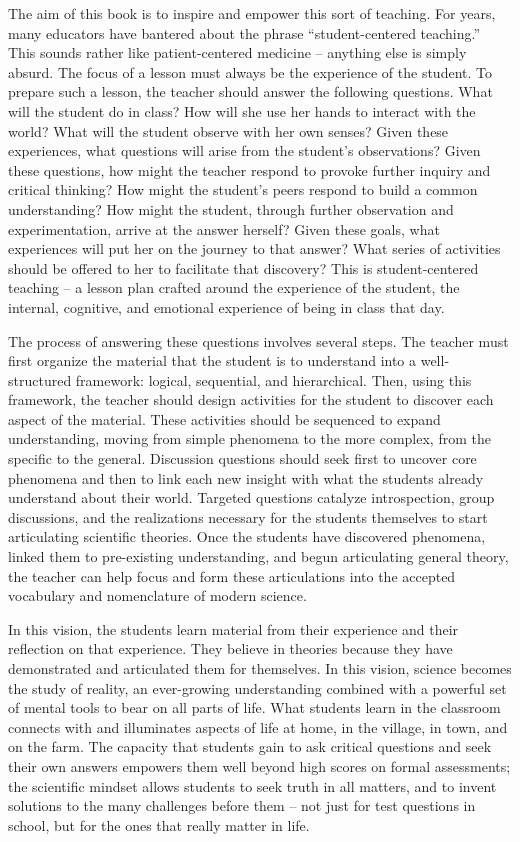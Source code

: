 The aim of this book is to inspire and empower this sort of teaching. 
For years, many educators have bantered about the phrase 
``student-centered teaching.'' 
This sounds rather like patient-centered medicine -- 
anything else is simply absurd. 
The focus of a lesson must always be the experience of the student. 
To prepare such a lesson, the teacher should answer the following questions. 
What will the student do in class? 
How will she use her hands to interact with the world? 
What will the student observe with her own senses? 
Given these experiences, 
what questions will arise from the student's observations? 
Given these questions, 
how might the teacher respond to provoke further inquiry and 
critical thinking? 
How might the student's peers respond to build a common understanding? 
How might the student, through further observation and experimentation, 
arrive at the answer herself? 
Given these goals, 
what experiences will put her on the journey to that answer? 
What series of activities should be offered to her 
to facilitate that discovery? 
This is student-centered teaching -- 
a lesson plan crafted around the experience of the student, 
the internal, cognitive, 
and emotional experience of being in class that day.

The process of answering these questions involves several steps. 
The teacher must first organize the material that 
the student is to understand into a well-structured framework: 
logical, sequential, and hierarchical. 
Then, using this framework, the teacher should design activities 
for the student to discover each aspect of the material. 
These activities should be sequenced to expand understanding, 
moving from simple phenomena to the more complex, 
from the specific to the general. 
Discussion questions should seek first to uncover core phenomena 
and then to link each new insight with 
what the students already understand about their world. 
Targeted questions catalyze introspection, group discussions, 
and the realizations necessary for the students themselves 
to start articulating scientific theories. 
Once the students have discovered phenomena, 
linked them to pre-existing understanding, 
and begun articulating general theory, 
the teacher can help focus and form these articulations 
into the accepted vocabulary and nomenclature of modern science.

In this vision, 
the students learn material from their experience and 
their reflection on that experience. 
They believe in theories because they have demonstrated and 
articulated them for themselves. 
In this vision, 
science becomes the study of reality, 
an ever-growing understanding combined with a powerful set of mental tools 
to bear on all parts of life. 
What students learn in the classroom connects with and 
illuminates aspects of life at home, 
in the village, in town, and on the farm. 
The capacity that students gain to ask critical questions and 
seek their own answers empowers them well beyond 
high scores on formal assessments; 
the scientific mindset allows students to seek truth in all matters, 
and to invent solutions to the many challenges before them -- 
not just for test questions in school, 
but for the ones that really matter in life.

